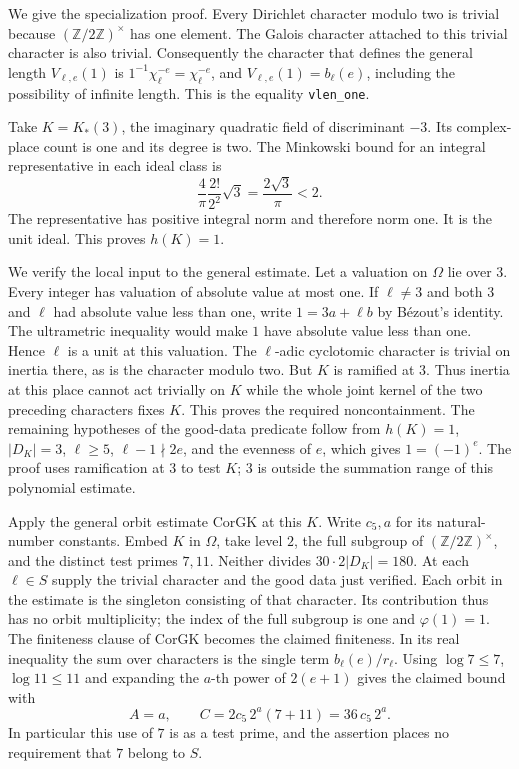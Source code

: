 We give the specialization proof. Every Dirichlet character modulo two
is trivial because \((\mathbb Z/2\mathbb Z)^\times\) has one element.
The Galois character attached to this trivial character is also trivial.
Consequently the character that defines the general length
\(V_{\ell,e}(1)\) is \(1^{-1}\chi_\ell^{-e}=\chi_\ell^{-e}\), and
\(V_{\ell,e}(1)=b_\ell(e)\), including the possibility of infinite
length. This is the equality \texttt{vlen\_\allowbreak{}one}.

Take \(K=K_*(3)\), the imaginary quadratic field of discriminant
\(-3\). Its complex-place count is one and its degree is two. The
Minkowski bound for an integral representative in each ideal class is
\[
   \frac{4}{\pi}\frac{2!}{2^2}\sqrt{3}
   =\frac{2\sqrt{3}}{\pi}<2 .
\]
The representative has positive integral norm and therefore norm one.
It is the unit ideal. This proves \(h(K)=1\).

We verify the local input to the general estimate. Let a valuation on
\(\Omega\) lie over \(3\). Every integer has valuation of absolute value
at most one. If \(\ell\ne3\) and both \(3\) and \(\ell\) had absolute
value less than one, write \(1=3a+\ell b\) by B\'ezout's identity.
The ultrametric inequality would make \(1\) have absolute value less
than one. Hence \(\ell\) is a unit at this valuation. The
\(\ell\)-adic cyclotomic character is trivial on inertia there, as is
the character modulo two. But \(K\) is ramified at \(3\). Thus inertia
at this place cannot act trivially on \(K\) while the whole joint
kernel of the two preceding characters fixes \(K\). This proves the
required noncontainment. The remaining hypotheses of the good-data
predicate follow from \(h(K)=1\), \(\lvert D_K\rvert=3\),
\(\ell\geq5\), \(\ell-1\nmid2e\), and the evenness of \(e\), which gives
\(1=(-1)^e\). The proof uses ramification at \(3\) to test \(K\); \(3\)
is outside the summation range of this polynomial estimate.

Apply the general orbit estimate \(\mathrm{CorGK}\) at this \(K\). Write
\(c_5,a\) for its natural-number constants. Embed \(K\) in \(\Omega\),
take level \(2\), the full subgroup of \((\mathbb Z/2\mathbb Z)^\times\),
and the distinct test primes \(7,11\). Neither divides
\(30\cdot2\lvert D_K\rvert=180\). At each \(\ell\in S\) supply the trivial
character and the good data just verified. Each orbit in the estimate
is the singleton consisting of that character. Its contribution thus
has no orbit multiplicity; the index of the full subgroup is one and
\(\varphi(1)=1\). The finiteness clause of \(\mathrm{CorGK}\) becomes
the claimed finiteness. In its real inequality the sum over characters
is the single term \(b_\ell(e)/r_\ell\). Using
\(\log 7\leq 7\), \(\log 11\leq11\) and expanding the \(a\)-th power of
\(2(e+1)\) gives the claimed bound with
\[
     A=a,\qquad C=2c_5\,2^a(7+11)=36\,c_5\,2^a .
\]
In particular this use of \(7\) is as a test prime, and the assertion
places no requirement that \(7\) belong to \(S\).


